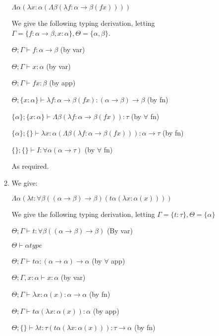 \begin{enumerate}[label=(\alph*)]
\begin{enumerate}[label=(\roman*)]
        $\Lambda \alpha (\lambda x : \alpha (\Lambda \beta (\lambda f : \alpha \rightarrow \beta (f x))))$

        We give the following typing derivation, letting $\Gamma = \{f : \alpha \rightarrow \beta, x : \alpha\}, \Theta = \{\alpha, \beta\}$.

        $\Theta;\Gamma \vdash f : \alpha \rightarrow \beta$ (by var)

        $\Theta;\Gamma \vdash x : \alpha$ (by var)

        $\Theta;\Gamma \vdash f x : \beta$ (by app)

        $\Theta;\{x : \alpha\} \vdash \lambda f : \alpha \rightarrow \beta (f x) : (\alpha \rightarrow \beta) \rightarrow \beta$ (by fn)

        $\{\alpha\};\{x : \alpha\} \vdash \Lambda \beta (\lambda f : \alpha \rightarrow \beta (f x)) : \tau$ (by $\forall$ fn)

        $\{\alpha\};\{\} \vdash \lambda x : \alpha (\Lambda \beta (\lambda f : \alpha \rightarrow \beta (f x))) : \alpha \rightarrow \tau$ (by fn)

        $\{\};\{\} \vdash I : \forall \alpha (\alpha \rightarrow \tau)$ (by $\forall$ fn)

        As required.

      \item
        We give:

        $\Lambda \alpha (\lambda t : \forall \beta ((\alpha \rightarrow \beta) \rightarrow \beta) (t \alpha (\lambda x : \alpha (x))))$

        We give the following typing derivation, letting $\Gamma = \{t : \tau\},  \Theta = \{\alpha\}$

        $\Theta;\Gamma \vdash t : \forall \beta ((\alpha \rightarrow \beta) \rightarrow \beta)$ (By var)

        $\Theta \vdash \alpha type$

        $\Theta;\Gamma \vdash t \alpha : (\alpha \rightarrow \alpha) \rightarrow \alpha$ (by $\forall$ app)

        $\Theta;\Gamma,x:\alpha \vdash x : \alpha$ (by var)

        $\Theta;\Gamma \vdash \lambda x : \alpha(x) : \alpha \rightarrow \alpha$ (by fn)

        $\Theta;\Gamma \vdash t \alpha (\lambda x : \alpha (x)) : \alpha$ (by app)

        $\Theta;\{\} \vdash \lambda t : \tau (t \alpha (\lambda x : \alpha (x))) : \tau \rightarrow \alpha$ (by fn)


\end{enumerate}
\end{enumerate}
